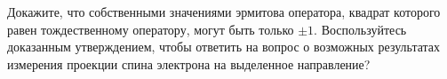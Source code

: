 \documentclass[__main__.tex]{subfiles}
\begin{document}
Докажите, что собственными значениями эрмитова оператора, квадрат которого равен тождественному оператору, могут быть только $\pm 1$. Воспользуйтесь доказанным утверждением, чтобы ответить на вопрос о возможных результатах измерения проекции спина электрона на выделенное направление?\\ 

\end{document}
